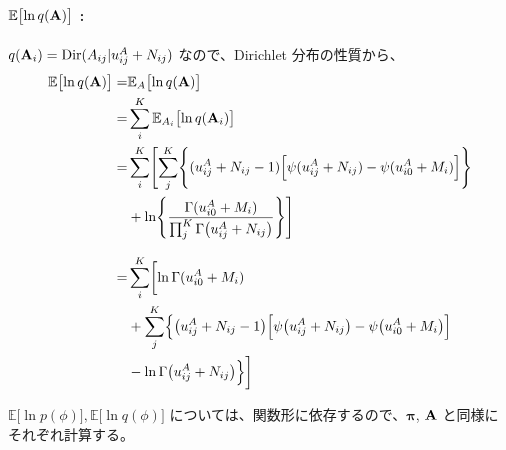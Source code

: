 \paragraph{ $\mathbb{E}\bigl[\ln q({\bf A}) \bigr]$ : }
$q({\bf A}_i) = {\rm Dir}(A_{ij}|u_{ij}^A + N_{ij})$ なので、Dirichlet  分布の性質から、
\begin{align}
  \mathbb{E}\bigl[\ln q({\bf A}) \bigr]  =&  \mathbb{E}_{A}\bigl[ \ln q({\bf A}) \bigr]  \\
%
  =&  \sum_i^K \mathbb{E}_{A_i}\bigl[ \ln q({\bf A}_i) \bigr]  \\
%
  =&  \sum_i^K \Biggl[ \sum_j^K \Biggl\{ (u_{ij}^A + N_{ij} - 1) \Bigl[ \psi(u_{ij}^A + N_{ij}) - \psi(u_{i0}^A + M_i) \Bigr] \Biggr\}  \notag  \\  
    &  + \ln \Biggl\{ \frac{ \Gamma(u_{i0}^A + M_i) }{ \prod_j^K \Gamma\bigl(u_{ij}^A + N_{ij}\bigr) } \Biggr\} \Biggr]  \\
%
\intertext{}
%
  =&  \sum_i^K \biggl[ \ln \Gamma(u_{i0}^A + M_i)  \notag  \\
  &  + \sum_j^K \Bigl\{ \bigl(u_{ij}^A + N_{ij} - 1\bigr) \Bigl[ \psi\bigl(u_{ij}^A + N_{ij}\bigr) - \psi\bigl(u_{i0}^A + M_i\bigr) \Bigr]  \notag  \\  
    &  - \ln \Gamma\bigl(u_{ij}^A + N_{ij}\bigr) \Bigr\} \biggr]  \label{eqn:expLnQA}
\end{align}


$\mathbb{E}\bigl[\ln p( \phi ) \bigr], \mathbb{E}\bigl[\ln q( \phi ) \bigr]$ については、関数形に依存するので、${\boldsymbol \pi}$, ${\bf A}$  と同様にそれぞれ計算する。


